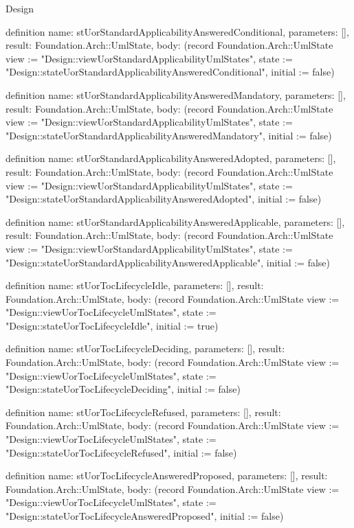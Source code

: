 \begin{lexlean}{Design}
\begin{semanticmodule}
definition{
  name: stUorStandardApplicabilityAnsweredConditional,
  parameters: [],
  result: Foundation.Arch::UmlState,
  body: (record Foundation.Arch::UmlState {view := "Design::viewUorStandardApplicabilityUmlStates", state := "Design::stateUorStandardApplicabilityAnsweredConditional", initial := false})
}

definition{
  name: stUorStandardApplicabilityAnsweredMandatory,
  parameters: [],
  result: Foundation.Arch::UmlState,
  body: (record Foundation.Arch::UmlState {view := "Design::viewUorStandardApplicabilityUmlStates", state := "Design::stateUorStandardApplicabilityAnsweredMandatory", initial := false})
}

definition{
  name: stUorStandardApplicabilityAnsweredAdopted,
  parameters: [],
  result: Foundation.Arch::UmlState,
  body: (record Foundation.Arch::UmlState {view := "Design::viewUorStandardApplicabilityUmlStates", state := "Design::stateUorStandardApplicabilityAnsweredAdopted", initial := false})
}

definition{
  name: stUorStandardApplicabilityAnsweredApplicable,
  parameters: [],
  result: Foundation.Arch::UmlState,
  body: (record Foundation.Arch::UmlState {view := "Design::viewUorStandardApplicabilityUmlStates", state := "Design::stateUorStandardApplicabilityAnsweredApplicable", initial := false})
}

definition{
  name: stUorTocLifecycleIdle,
  parameters: [],
  result: Foundation.Arch::UmlState,
  body: (record Foundation.Arch::UmlState {view := "Design::viewUorTocLifecycleUmlStates", state := "Design::stateUorTocLifecycleIdle", initial := true})
}

definition{
  name: stUorTocLifecycleDeciding,
  parameters: [],
  result: Foundation.Arch::UmlState,
  body: (record Foundation.Arch::UmlState {view := "Design::viewUorTocLifecycleUmlStates", state := "Design::stateUorTocLifecycleDeciding", initial := false})
}

definition{
  name: stUorTocLifecycleRefused,
  parameters: [],
  result: Foundation.Arch::UmlState,
  body: (record Foundation.Arch::UmlState {view := "Design::viewUorTocLifecycleUmlStates", state := "Design::stateUorTocLifecycleRefused", initial := false})
}

definition{
  name: stUorTocLifecycleAnsweredProposed,
  parameters: [],
  result: Foundation.Arch::UmlState,
  body: (record Foundation.Arch::UmlState {view := "Design::viewUorTocLifecycleUmlStates", state := "Design::stateUorTocLifecycleAnsweredProposed", initial := false})
}


\end{semanticmodule}
\end{lexlean}
